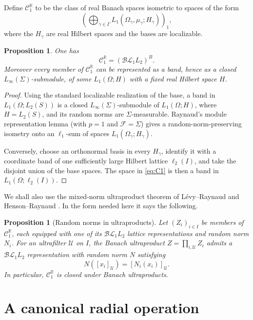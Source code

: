\documentclass[11pt]{article}
\newcommand{\BL}{\mathcal{BL}}
\newcommand{\C}{\mathcal C}
\newcommand{\U}{\mathcal U}
\newcommand{\R}{\mathbb R}
\newcommand{\1}{\mathbf 1}
\newtheorem{proposition}[theorem]{Proposition}
\theoremstyle{definition}
\theoremstyle{remark}
\begin{document}
Define $\C_1^{\R}$ to be the class of real Banach spaces isometric to spaces
of the form
\begin{equation}
\label{eq:C1}
       \left(\bigoplus_{\gamma\in\Gamma}
       L_1(\Omega_\gamma,\mu_\gamma;H_\gamma)\right)_1,
\end{equation}
where the $H_\gamma$ are real Hilbert spaces and the bases are localizable.

\begin{proposition}
\label{prop:C1=BL}
One has
\[
                   \C_1^{\R}=(\BL_1L_2)^B.
\]
Moreover every member of $\C_1^{\R}$ can be represented as a band, hence as
a closed $L_\infty(\Sigma)$-submodule, of some $L_1(\Omega;H)$ with a fixed
real Hilbert space $H$.
\end{proposition}

\begin{proof}
Using the standard localizable realization of the base, a band in
$L_1(\Omega;L_2(S))$ is a closed $L_\infty(\Sigma)$-submodule of
$L_1(\Omega;H)$, where $H=L_2(S)$, and its random norms are
$\Sigma$-measurable.  Raynaud's module representation lemma
\cite[Lemma~4.4]{Raynaud2004} (with $p=1$ and $\mathcal F=\Sigma$) gives a
random-norm-preserving isometry onto an $\ell_1$-sum of spaces
$L_1(\Omega_\gamma;H_\gamma)$.

Conversely, choose an orthonormal basis in every $H_\gamma$, identify it
with a coordinate band of one sufficiently large Hilbert lattice
$\ell_2(I)$, and take the disjoint union of the base spaces.  The space in
\eqref{eq:C1} is then a band in $L_1(\Omega;\ell_2(I))$.
\end{proof}

We shall also use the mixed-norm ultraproduct theorem of L\'evy--Raynaud and
Henson--Raynaud \cite{LevyRaynaud1984,HensonRaynaud2007,HensonRaynaud2011}.
In the form needed here it says the following.

\begin{proposition}[Random norms in ultraproducts]
\label{prop:random-ultra}
Let $(Z_i)_{i\in I}$ be members of $\C_1^{\R}$, each equipped with one of its
$\BL_1L_2$ lattice representations and random norm $N_i$.  For an
ultrafilter $\U$ on $I$, the Banach ultraproduct
$Z=\prod_{i,\U}Z_i$ admits a $\BL_1L_2$ representation with random norm $N$
satisfying
\[
             N([x_i]_{\U})=[N_i(x_i)]_{\U}.
\]
In particular, $\C_1^{\R}$ is closed under Banach ultraproducts.
\end{proposition}

\section{A canonical radial operation}
\end{document}
